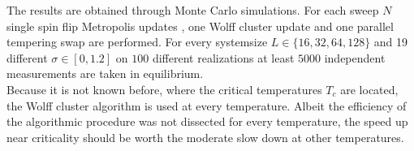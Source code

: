 \label{sec:results}
The results are obtained through Monte Carlo simulations. For each
sweep \(N\) single spin flip Metropolis updates \cite{Metropolis1953},
one Wolff cluster update \cite{Wolff1989} and one
parallel tempering swap \cite{ParallelTempering1986} are performed.
For every systemsize $L \in \{16,32,64,128\}$ and 19 different
$\sigma \in [0,1.2]$ on $100$ different realizations at least $5000$
independent measurements are taken in equilibrium.\\
Because it is not known before, where the critical temperatures \(T_c\)
are located, the Wolff cluster algorithm is used at every
temperature. Albeit the efficiency of the algorithmic procedure was
not dissected for every temperature, the speed up near criticality
should be worth the moderate slow down at other temperatures.\\

